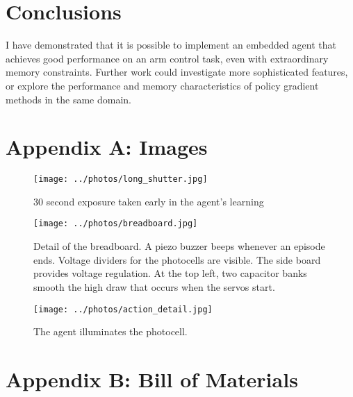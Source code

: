 \documentclass{article}
\begin{document}
	
	\section{Conclusions}

	I have demonstrated that it is possible to implement an embedded agent that achieves good performance on an arm control task, even with extraordinary memory constraints. Further work could investigate more sophisticated features, or explore the performance and memory characteristics of policy gradient methods in the same domain.
	
	\clearpage
	
	
	\section{Appendix A: Images}
	
		\begin{figure}[!htb]
			\centering
			\texttt{[image: ../photos/long\_shutter.jpg]}
			\caption{30 second exposure taken early in the agent's learning}
			\label{fig:long_shutter}
		\end{figure}
		
		\begin{figure}[!htb]
			\centering
			\texttt{[image: ../photos/breadboard.jpg]}
			\caption{Detail of the breadboard. A piezo buzzer beeps whenever an episode ends. Voltage dividers for the photocells are visible. The side board provides voltage regulation. At the top left, two capacitor banks smooth the high draw that occurs when the servos start. }
			\label{fig:breadboard}
		\end{figure}
		
		\begin{figure}[!htb]
			\centering
			\texttt{[image: ../photos/action\_detail.jpg]}
			\caption{The agent illuminates the photocell.}
			\label{fig:breadboard}
		\end{figure}

	
	\section{Appendix B: Bill of Materials}
	
\end{document}
